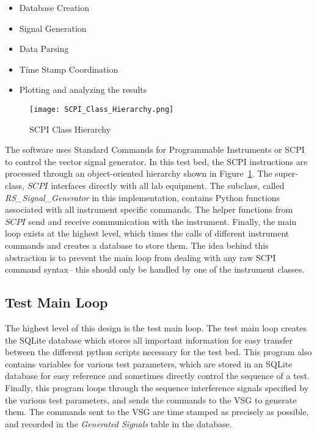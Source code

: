 \begin{itemize}
\item Database Creation 
\item Signal Generation
\item Data Parsing
\item Time Stamp Coordination
\item Plotting and analyzing the results
\end{itemize}

\begin{figure}[ht]
\centering
\texttt{[image: SCPI\_Class\_Hierarchy.png]}
\caption{SCPI Class Hierarchy}

\label{fig:SCPI}

\end{figure}
The software uses Standard Commands for Programmable Instruments or SCPI to control the vector signal generator. In this test bed, the SCPI instructions are processed through an object-oriented hierarchy shown in Figure~\ref{fig:SCPI}. The super-class, $SCPI$ interfaces directly with all lab equipment. The subclass, called \textit{RS\_Signal\_Generator} in this implementation, contains Python functions associated with all instrument specific commands. The helper functions from $SCPI$ send and receive communication with the instrument. Finally, the main loop exists at the highest level, which times the calls of different instrument commands and creates a database to store them. The idea behind this abstraction is to prevent the main loop from dealing with any raw SCPI command syntax-- this should only be handled by one of the instrument classes. 



\subsection{Test Main Loop}\label{sub:mainloop}
The highest level of this design is the test main loop. The test main loop creates the SQLite database which stores all important information for easy transfer between the different python scripts necessary for the test bed. This program also contains variables for various test parameters, which are stored in an SQLite database for easy reference and sometimes directly control the sequence of a test. Finally, this program loops through the sequence interference signals specified by the various test parameters, and sends the commands to the VSG to generate them. The commands sent to the VSG are time stamped as precisely as possible, and recorded in the \textit{Generated Signals} table in the database. 


